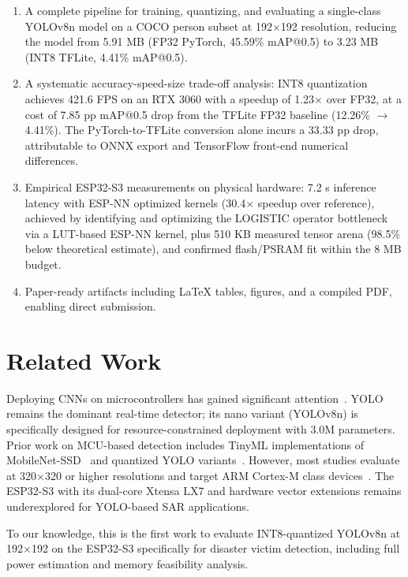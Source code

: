 \documentclass[10pt,twocolumn]{article}
\begin{document}
\begin{enumerate}
  \item A complete pipeline for training, quantizing, and evaluating a single-class YOLOv8n model on a COCO person subset at 192$\times$192 resolution, reducing the model from 5.91 MB (FP32 PyTorch, 45.59\% mAP@0.5) to 3.23 MB (INT8 TFLite, 4.41\% mAP@0.5).
  \item A systematic accuracy-speed-size trade-off analysis: INT8 quantization achieves 421.6 FPS on an RTX 3060 with a speedup of 1.23$\times$ over FP32, at a cost of 7.85 pp mAP@0.5 drop from the TFLite FP32 baseline (12.26\% $\rightarrow$ 4.41\%). The PyTorch-to-TFLite conversion alone incurs a 33.33 pp drop, attributable to ONNX export and TensorFlow front-end numerical differences.
  \item Empirical ESP32-S3 measurements on physical hardware: 7.2 s inference latency with ESP-NN optimized kernels (30.4$\times$ speedup over reference), achieved by identifying and optimizing the LOGISTIC operator bottleneck via a LUT-based ESP-NN kernel, plus 510 KB measured tensor arena (98.5\% below theoretical estimate), and confirmed flash/PSRAM fit within the 8 MB budget.
  \item Paper-ready artifacts including LaTeX tables, figures, and a compiled PDF, enabling direct submission.
\end{enumerate}

\section{Related Work}
\label{sec:related}

Deploying CNNs on microcontrollers has gained significant attention~\cite{mcunet,micronets,cmsisnn}. YOLO~\cite{yolov1,yolov3,yolov4,ultralytics} remains the dominant real-time detector; its nano variant (YOLOv8n) is specifically designed for resource-constrained deployment with 3.0M parameters. Prior work on MCU-based detection includes TinyML implementations of MobileNet-SSD~\cite{tinyml,mobilenets,mobilenetv2} and quantized YOLO variants~\cite{edgeyolo}. However, most studies evaluate at 320$\times$320 or higher resolutions and target ARM Cortex-M class devices~\cite{banbury2020bench}. The ESP32-S3 with its dual-core Xtensa LX7 and hardware vector extensions remains underexplored for YOLO-based SAR applications.

To our knowledge, this is the first work to evaluate INT8-quantized YOLOv8n at 192$\times$192 on the ESP32-S3 specifically for disaster victim detection, including full power estimation and memory feasibility analysis.
\end{document}
